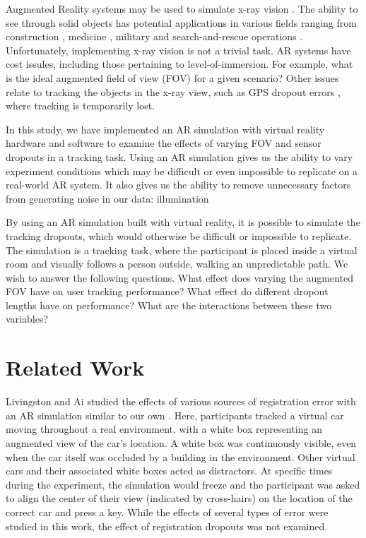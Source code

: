 \documentclass{acmsiggraph}                     %
\begin{document}


Augmented Reality systems may be used to simulate x-ray vision \cite{1383060}.  The ability to see through solid objects has potential applications in various fields ranging from construction \cite{Webster96augmentedreality}, medicine \cite{azuma95survey}, military \cite{Livingston02anaugmented} and search-and-rescue operations \cite{1528424}.  Unfortunately, implementing x-ray vision is not a trivial task.  AR systems have cost issules, including those pertaining to level-of-immersion.  For example, what is the ideal augmented field of view (FOV) for a given scenario?  Other issues relate to tracking the objects in the x-ray view, such as GPS dropout errors \cite{4079263}, where tracking is temporarily lost.

In this study, we have implemented an AR simulation with virtual reality hardware and software to examine the effects of varying FOV and sensor dropouts in a tracking task.  Using an AR simulation gives us the ability to vary experiment conditions which may be difficult or even impossible to replicate on a real-world AR system.  It also gives us the ability to remove unnecessary factors from generating noise in our data: illumination 

By using an AR simulation built with virtual reality, it is possible to simulate the tracking dropouts, which would otherwise be difficult or impossible to replicate.  The simulation is a tracking task, where the participant is placed inside a virtual room and visually follows a person outside, walking an unpredictable path.  We wish to answer the following questions.  What effect does varying the augmented FOV have on user tracking performance?  What effect do different dropout lengths have on performance?  What are the interactions between these two variables?

\section{Related Work}

Livingston and Ai studied the effects of various sources of registration error with an AR simulation similar to our own \cite{4637329}.  Here, participants tracked a virtual car moving throughout a real environment, with a white box representing an augmented view of the car's location.  A white box was continuously visible, even when the car itself was occluded by a building in the environment.  Other virtual cars and their associated white boxes acted as distractors.  At specific times during the experiment, the simulation would freeze and the participant was asked to align the center of their view (indicated by cross-hairs) on the location of the correct car and press a key.  While the effects of several types of error were studied in this work, the effect of registration dropouts was not examined.
\end{document}
